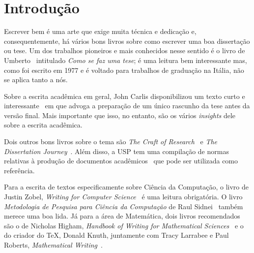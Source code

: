 

\chapter{Introdução}
\label{cap:introducao}

Escrever bem é uma arte que exige muita técnica e dedicação e,
consequentemente, há vários bons livros sobre como escrever uma boa
dissertação ou tese. Um dos trabalhos pioneiros e mais conhecidos nesse
sentido é o livro de Umberto~\citet{eco:09} intitulado \emph{Como se faz
uma tese}; é uma leitura bem interessante mas, como foi escrito em 1977 e
é voltado para trabalhos de graduação na Itália, não se aplica tanto a nós.

Sobre a escrita acadêmica em geral, John Carlis disponibilizou um texto curto
e interessante~\citep{carlis:09} em que advoga a preparação de um único
rascunho da tese antes da versão final. Mais importante que isso, no
entanto, são os vários \textit{insights} dele sobre a escrita acadêmica.

Dois outros bons livros sobre o tema são \emph{The Craft of Research}~\citep{craftresearch}
e \emph{The Dissertation Journey}~\citep{dissertjourney}. Além disso,
a USP tem uma compilação de normas relativas à produção de documentos
acadêmicos~\citep{usp:guidelines} que pode ser utilizada como referência.

Para a escrita de textos especificamente sobre Ciência da Computação, o
livro de Justin Zobel, \emph{Writing for Computer Science}~\citep{zobel:14}
é uma leitura obrigatória. O livro \emph{Metodologia de Pesquisa para
Ciência da Computação} de Raul Sidnei~\citet{waz:20}
também merece uma boa lida. Já para a área de Matemática, dois livros
recomendados são o de Nicholas Higham, \emph{Handbook of Writing for
Mathematical Sciences}~\citep{higham:19} e o do criador do \TeX{}, Donald
Knuth, juntamente com Tracy Larrabee e Paul Roberts, \emph{Mathematical
Writing}~\citep{knuth:96}.

